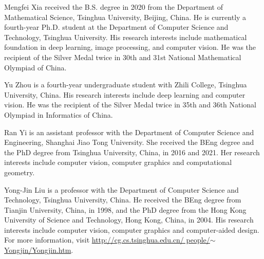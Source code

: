 \begin{IEEEbiography}{Mengfei Xia}
received the B.S. degree in 2020 from the Department of Mathematical Science, Tsinghua University, Beijing, China. He is currently a fourth-year Ph.D. student at the Department of Computer Science and Technology, Tsinghua University. His
research interests include mathematical foundation in
deep learning, image processing, and computer vision. He was the recipient of the Silver Medal twice in 30th and 31st National Mathematical Olympiad of China.
\end{IEEEbiography}


\begin{IEEEbiography}{Yu Zhou}
is a fourth-year undergraduate student with Zhili College, Tsinghua University, China. His research interests include deep learning and computer vision. He was the recipient of the Silver Medal twice in 35th and 36th National Olympiad in Informatics of China.
\end{IEEEbiography}


\begin{IEEEbiography}{Ran Yi}
is an assistant professor with the Department of Computer Science and Engineering, Shanghai Jiao Tong University. She received the BEng degree and the PhD degree from Tsinghua University, China, in 2016 and 2021. Her research interests include computer vision, computer graphics and computational geometry.
\end{IEEEbiography}


\begin{IEEEbiography}{Yong-Jin Liu}
is a professor with the Department of Computer Science and Technology, Tsinghua University, China. He received the BEng degree from Tianjin University, China, in 1998, and the PhD degree from the Hong Kong University of Science and Technology, Hong Kong, China, in 2004. His research interests include computer vision, computer graphics and computer-aided design. For more information, visit 
\href{http://cg.cs.tsinghua.edu.cn/people/~Yongjin/Yongjin.htm}{http://cg.cs.tsinghua.edu.cn/ people/$\sim$Yongjin/Yongjin.htm}.
\end{IEEEbiography}

